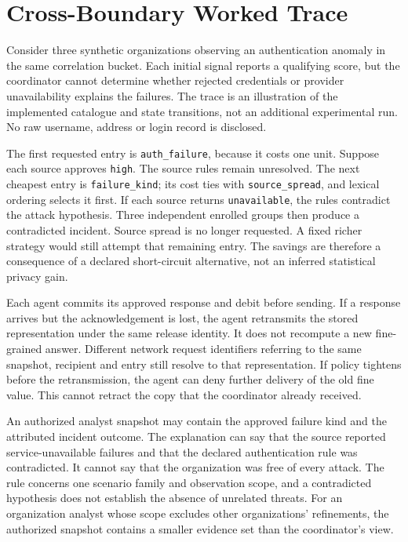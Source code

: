\section{Cross-Boundary Worked Trace}
Consider three synthetic organizations observing an authentication anomaly in the same correlation bucket. Each initial signal reports a qualifying score, but the coordinator cannot determine whether rejected credentials or provider unavailability explains the failures. The trace is an illustration of the implemented catalogue and state transitions, not an additional experimental run. No raw username, address or login record is disclosed.

The first requested entry is \texttt{auth\_failure}, because it costs one unit. Suppose each source approves \texttt{high}. The source rules remain unresolved. The next cheapest entry is \texttt{failure\_kind}; its cost ties with \texttt{source\_spread}, and lexical ordering selects it first. If each source returns \texttt{unavailable}, the rules contradict the attack hypothesis. Three independent enrolled groups then produce a contradicted incident. Source spread is no longer requested. A fixed richer strategy would still attempt that remaining entry. The savings are therefore a consequence of a declared short-circuit alternative, not an inferred statistical privacy gain.

Each agent commits its approved response and debit before sending. If a response arrives but the acknowledgement is lost, the agent retransmits the stored representation under the same release identity. It does not recompute a new fine-grained answer. Different network request identifiers referring to the same snapshot, recipient and entry still resolve to that representation. If policy tightens before the retransmission, the agent can deny further delivery of the old fine value. This cannot retract the copy that the coordinator already received.

An authorized analyst snapshot may contain the approved failure kind and the attributed incident outcome. The explanation can say that the source reported service-unavailable failures and that the declared authentication rule was contradicted. It cannot say that the organization was free of every attack. The rule concerns one scenario family and observation scope, and a contradicted hypothesis does not establish the absence of unrelated threats. For an organization analyst whose scope excludes other organizations' refinements, the authorized snapshot contains a smaller evidence set than the coordinator's view.

